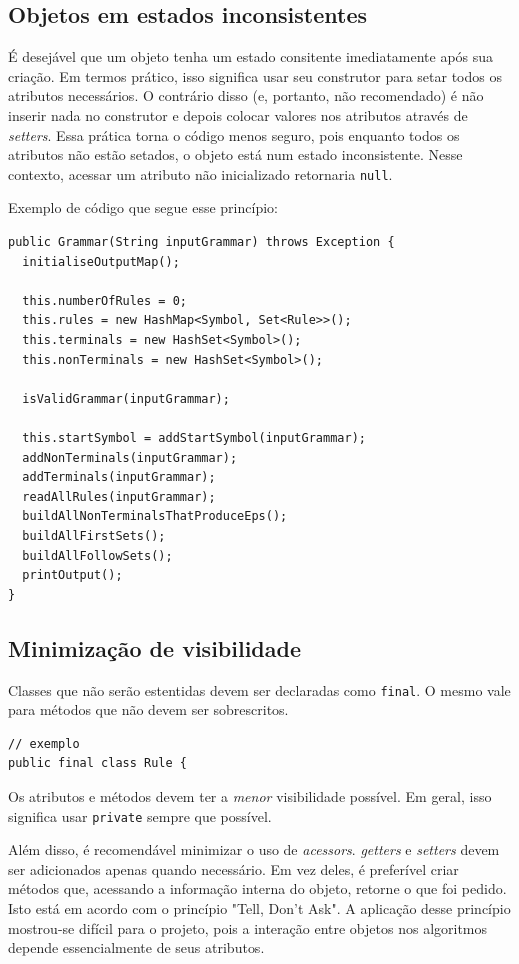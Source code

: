 \documentclass[11pt]{article}
\begin{document}
\subsection{Objetos em estados inconsistentes}
\label{sec:orgheadline18}
É desejável que um objeto tenha um estado consitente imediatamente após sua
criação. Em termos prático, isso significa usar seu construtor para setar todos
os atributos necessários. O contrário disso (e, portanto, não recomendado) é não
inserir nada no construtor e depois colocar valores nos atributos através de \emph{setters}. 
Essa prática torna o código menos seguro, pois enquanto todos os atributos não
estão setados, o objeto está num estado inconsistente. Nesse contexto, acessar um
atributo não inicializado retornaria \texttt{null}.

Exemplo de código que segue esse princípio:

\begin{verbatim}
public Grammar(String inputGrammar) throws Exception {
  initialiseOutputMap();

  this.numberOfRules = 0;
  this.rules = new HashMap<Symbol, Set<Rule>>();
  this.terminals = new HashSet<Symbol>();
  this.nonTerminals = new HashSet<Symbol>();

  isValidGrammar(inputGrammar);

  this.startSymbol = addStartSymbol(inputGrammar);
  addNonTerminals(inputGrammar);
  addTerminals(inputGrammar);
  readAllRules(inputGrammar);
  buildAllNonTerminalsThatProduceEps();
  buildAllFirstSets();
  buildAllFollowSets();
  printOutput();
}
\end{verbatim}

\subsection{Minimização de visibilidade}
\label{sec:orgheadline19}
Classes que não serão estentidas devem ser declaradas como \texttt{final}. O mesmo vale
para métodos que não devem ser sobrescritos.

\begin{verbatim}
// exemplo
public final class Rule {
\end{verbatim}

Os atributos e métodos devem ter a \emph{menor} visibilidade possível. Em
geral, isso significa usar \texttt{private} sempre que possível.

Além disso, é recomendável minimizar o uso de \emph{acessors}. \emph{getters} e \emph{setters}
devem ser adicionados apenas quando necessário. Em vez deles, é preferível criar
métodos que, acessando a informação interna do objeto, retorne o que foi pedido.
Isto está em acordo com o princípio "Tell, Don't Ask". A aplicação desse
princípio mostrou-se difícil para o projeto, pois a interação entre objetos nos
algoritmos depende essencialmente de seus atributos.
\end{document}
